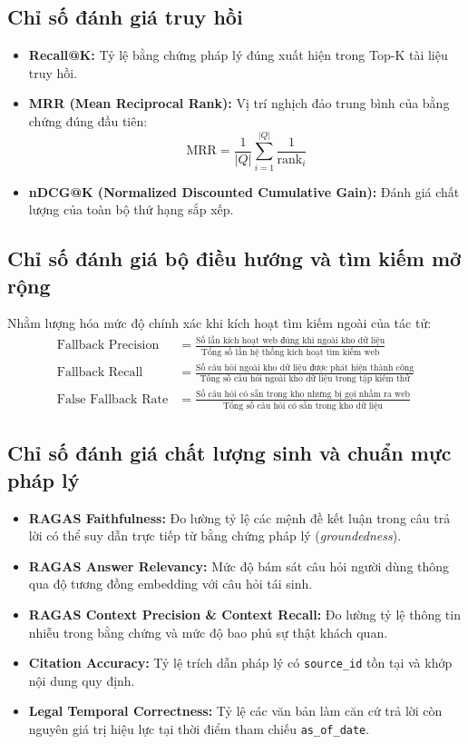 \subsection{Chỉ số đánh giá truy hồi}
\begin{itemize}
    \item \textbf{Recall@K:} Tỷ lệ bằng chứng pháp lý đúng xuất hiện trong Top-K tài liệu truy hồi.
    \item \textbf{MRR (Mean Reciprocal Rank):} Vị trí nghịch đảo trung bình của bằng chứng đúng đầu tiên:
    \begin{equation}
    \text{MRR} = \frac{1}{|Q|} \sum_{i=1}^{|Q|} \frac{1}{\text{rank}_i}
    \end{equation}
    \item \textbf{nDCG@K (Normalized Discounted Cumulative Gain):} Đánh giá chất lượng của toàn bộ thứ hạng sắp xếp.
\end{itemize}

\subsection{Chỉ số đánh giá bộ điều hướng và tìm kiếm mở rộng}
Nhằm lượng hóa mức độ chính xác khi kích hoạt tìm kiếm ngoài của tác tử:
\begin{align}
\text{Fallback Precision} &= \frac{\text{Số lần kích hoạt web đúng khi ngoài kho dữ liệu}}{\text{Tổng số lần hệ thống kích hoạt tìm kiếm web}} \\[0.5em]
\text{Fallback Recall} &= \frac{\text{Số câu hỏi ngoài kho dữ liệu được phát hiện thành công}}{\text{Tổng số câu hỏi ngoài kho dữ liệu trong tập kiểm thử}} \\[0.5em]
\text{False Fallback Rate} &= \frac{\text{Số câu hỏi có sẵn trong kho nhưng bị gọi nhầm ra web}}{\text{Tổng số câu hỏi có sẵn trong kho dữ liệu}}
\end{align}

\subsection{Chỉ số đánh giá chất lượng sinh và chuẩn mực pháp lý}
\begin{itemize}
    \item \textbf{RAGAS Faithfulness:} Đo lường tỷ lệ các mệnh đề kết luận trong câu trả lời có thể suy dẫn trực tiếp từ bằng chứng pháp lý (\textit{groundedness}).
    \item \textbf{RAGAS Answer Relevancy:} Mức độ bám sát câu hỏi người dùng thông qua độ tương đồng embedding với câu hỏi tái sinh.
    \item \textbf{RAGAS Context Precision \& Context Recall:} Đo lường tỷ lệ thông tin nhiễu trong bằng chứng và mức độ bao phủ sự thật khách quan.
    \item \textbf{Citation Accuracy:} Tỷ lệ trích dẫn pháp lý có \texttt{source\_id} tồn tại và khớp nội dung quy định.
    \item \textbf{Legal Temporal Correctness:} Tỷ lệ các văn bản làm căn cứ trả lời còn nguyên giá trị hiệu lực tại thời điểm tham chiếu \texttt{as\_of\_date}.
\end{itemize}

